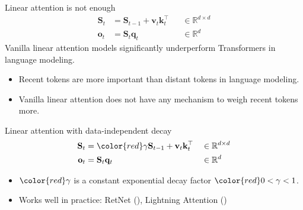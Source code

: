 \begin{frame}{Linear attention is not enough}
    \begin{align*}
        \mathbf{S}_t &= \mathbf{S}_{t-1} + \mathbf{v}_t\mathbf{k}_t^\top &&\in \mathbb{R}^{d \times d}  \\
        \mathbf{o}_t &= \mathbf{S}_t\mathbf{q}_t &&\in \mathbb{R}^d  
    \end{align*}
    Vanilla linear attention models significantly underperform Transformers in language modeling.
    \begin{itemize}
        \item Recent tokens are more important than distant tokens in language modeling.
        \item Vanilla linear attention does not have any mechanism to weigh recent tokens more.
    \end{itemize}

\end{frame}


\begin{frame}{Linear attention with data-independent decay}
    \begin{align*}
        \mathbf{S}_t &= {\color{red}\gamma} \mathbf{S}_{t-1} + \mathbf{v}_t\mathbf{k}_t^\top &&\in \mathbb{R}^{d \times d}  \\
        \mathbf{o}_t &= \mathbf{S}_t\mathbf{q}_t &&\in \mathbb{R}^d  
    \end{align*}
    \begin{itemize}
        \item ${\color{red}\gamma}$ is a constant exponential decay factor ${\color{red}0 < \gamma < 1}$.
        \item Works well in practice: RetNet (\cite{sun2023retentive}), Lightning Attention (\cite{Qin2024VariousLC})
    \end{itemize}
\end{frame}



